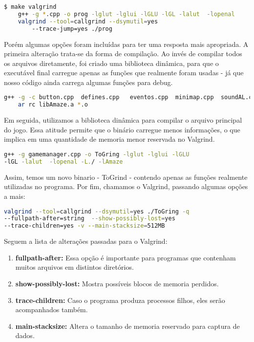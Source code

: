 \begin{lstlisting}[language=bash,title=\textit{Gerando arquivo callgrind.out},numbers=none]
$ make valgrind
	g++ -g *.cpp -o prog -lglut -lglui -lGLU -lGL -lalut  -lopenal
	valgrind --tool=callgrind --dsymutil=yes 
		--trace-jump=yes ./prog
\end{lstlisting}

Porém algumas opções foram incluídas para ter uma resposta mais apropriada. A primeira alteração trata-se da forma de compilação. Ao invés de compilar todos os arquivos diretamente, foi criado uma biblioteca dinâmica, para que o executável final carregue apenas as funções que realmente foram usadas - já que nosso código ainda carrega algumas funções para debug.

\begin{lstlisting}[language=bash,title=\textit{Gerando uma biblioteca dinâmica},numbers=none]
	g++ -g -c button.cpp  defines.cpp   eventos.cpp  minimap.cpp  soundAL.cpp  textureloader.cpp camera.cpp  entidade.cpp  framerate.cpp  map.cpp          player.cpp   text.cpp     tile.cpp
	ar rc libAmaze.a *.o
\end{lstlisting}

Em seguida, utilizamos a biblioteca dinâmica para compilar o arquivo principal do jogo. Essa atitude permite que o binário carregue menos informações, o que implica em uma quantidade de memoria menor reservada no Valgrind.

\begin{lstlisting}[language=bash,title=\textit{Compilando com a biblioteca dinâmica},numbers=none]
	g++ -g gamemanager.cpp -o ToGring -lglut -lglui -lGLU 
-lGL -lalut  -lopenal -L./ -lAmaze
\end{lstlisting}

Assim, temos um novo binario - ToGrind - contendo apenas as funções realmente utilizadas no programa. Por fim, chamamos o Valgrind, passando algumas opções a mais:

\begin{lstlisting}[language=bash,title=\textit{Chamada personalizada do Valgrind},numbers=none]
	valgrind --tool=callgrind --dsymutil=yes ./ToGring -q 
--fullpath-after=string  --show-possibly-lost=yes 
--trace-children=yes -v --main-stacksize=512MB
\end{lstlisting}

Seguem a lista de alterações passadas para o Valgrind:

\begin{enumerate}
	\item \textbf{fullpath-after:} Essa opção é importante para programas que contenham muitos arquivos em distintos diretórios.
	\item \textbf{show-possibly-lost:} Mostra possíveis blocos de memoria perdidos.
	\item \textbf{trace-children:} Caso o programa produza processos filhos, eles serão acompanhados também.
	\item \textbf{main-stacksize:} Altera o tamanho de memoria reservado para captura de dados.
\end{enumerate}

